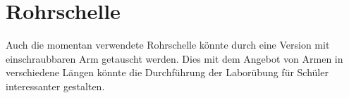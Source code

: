 \section{Rohrschelle}
\label{rohrschelle}

Auch die momentan verwendete Rohrschelle könnte durch eine Version mit einschraubbaren Arm getauscht werden.
Dies mit dem Angebot von Armen in verschiedene Längen könnte die Durchführung der Laborübung für Schüler interessanter gestalten.